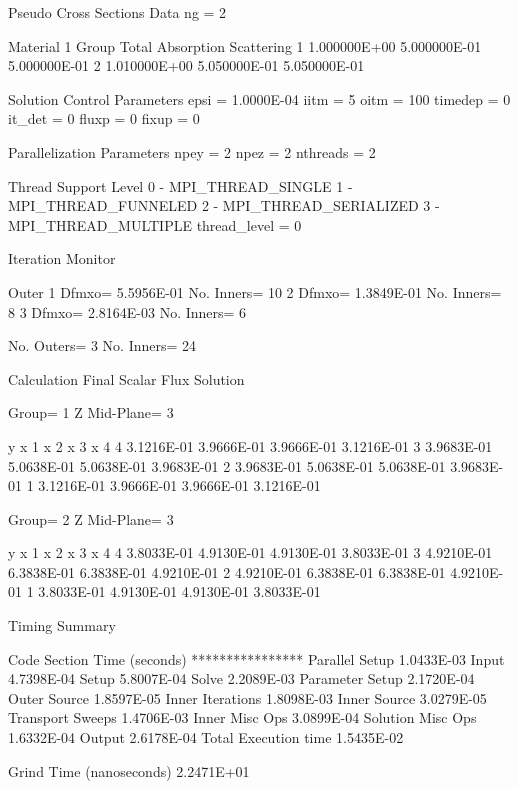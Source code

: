 \begin{DoxyVerb}
  Pseudo Cross Sections Data
    ng =   2

    Material 1
    Group         Total         Absorption      Scattering
       1       1.000000E+00    5.000000E-01    5.000000E-01
       2       1.010000E+00    5.050000E-01    5.050000E-01

  Solution Control Parameters
    epsi =  1.0000E-04
    iitm =   5
    oitm =  100
    timedep = 0
    it_det = 0
    fluxp = 0
    fixup = 0

  Parallelization Parameters
    npey =     2
    npez =     2
    nthreads =    2

          Thread Support Level
           0 - MPI_THREAD_SINGLE
           1 - MPI_THREAD_FUNNELED
           2 - MPI_THREAD_SERIALIZED
           3 - MPI_THREAD_MULTIPLE
    thread_level =  0

          Iteration Monitor

  Outer
    1    Dfmxo= 5.5956E-01    No. Inners=   10
    2    Dfmxo= 1.3849E-01    No. Inners=    8
    3    Dfmxo= 2.8164E-03    No. Inners=    6

  No. Outers=   3    No. Inners=   24

          Calculation Final Scalar Flux Solution

  Group=   1   Z Mid-Plane=    3

     y    x    1      x    2      x    3      x    4
     4  3.1216E-01  3.9666E-01  3.9666E-01  3.1216E-01
     3  3.9683E-01  5.0638E-01  5.0638E-01  3.9683E-01
     2  3.9683E-01  5.0638E-01  5.0638E-01  3.9683E-01
     1  3.1216E-01  3.9666E-01  3.9666E-01  3.1216E-01

  Group=   2   Z Mid-Plane=    3

     y    x    1      x    2      x    3      x    4
     4  3.8033E-01  4.9130E-01  4.9130E-01  3.8033E-01
     3  4.9210E-01  6.3838E-01  6.3838E-01  4.9210E-01
     2  4.9210E-01  6.3838E-01  6.3838E-01  4.9210E-01
     1  3.8033E-01  4.9130E-01  4.9130E-01  3.8033E-01

          Timing Summary

  Code Section                          Time (seconds)
                                       ****************
    Parallel Setup                       1.0433E-03
    Input                                4.7398E-04
    Setup                                5.8007E-04
    Solve                                2.2089E-03
       Parameter Setup                   2.1720E-04
       Outer Source                      1.8597E-05
       Inner Iterations                  1.8098E-03
          Inner Source                   3.0279E-05
          Transport Sweeps               1.4706E-03
          Inner Misc Ops                 3.0899E-04
       Solution Misc Ops                 1.6332E-04
    Output                               2.6178E-04
  Total Execution time                   1.5435E-02

  Grind Time (nanoseconds)         2.2471E+01
\end{DoxyVerb}


